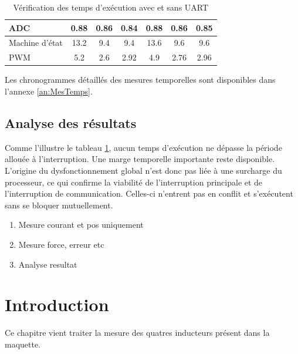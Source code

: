 \begin{table}[H]
{\begin{tabular}{|l|c|c|c|c|c|c|}
            ADC                                                    & 0.88                                                                & 0.86                                                                   & 0.84                                                                   & 0.88                                                                & 0.86                                                                   & 0.85                                                                   \\ \hline
            Machine d'état                                         & 13.2                                                                & 9.4                                                                    & 9.4                                                                    & 13.6                                                                & 9.6                                                                    & 9.6                                                                    \\ \hline
            PWM                                                    & 5.2                                                                 & 2.6                                                                    & 2.92                                                                   & 4.9                                                                 & 2.76                                                                   & 2.96                                                                   \\ \hline
        \end{tabular}%
    }
    \caption{Vérification des temps d'exécution avec et sans UART}
    \label{tab:verif_temps_final}
\end{table}

Les chronogrammes détaillés des mesures temporelles sont disponibles dans l'annexe \ref{an:MesTemps}.

\subsection{Analyse des résultats}
Comme l'illustre le tableau \ref{tab:verif_temps_final}, aucun temps d'exécution ne dépasse la période allouée à l'interruption. Une marge temporelle importante reste disponible. L'origine du dysfonctionnement global n'est donc pas liée à une surcharge du processeur, ce qui confirme la viabilité de l'interruption principale et de l'interruption de communication. Celles-ci n'entrent pas en conflit et s'exécutent sans se bloquer mutuellement.


\begin{enumerate}
    \item Mesure courant et pos uniquement
    \item Mesure force, erreur etc
    \item Analyse resultat
\end{enumerate}

\section{Introduction}
Ce chapitre vient traiter la mesure des quatres inducteurs présent dans la maquette.